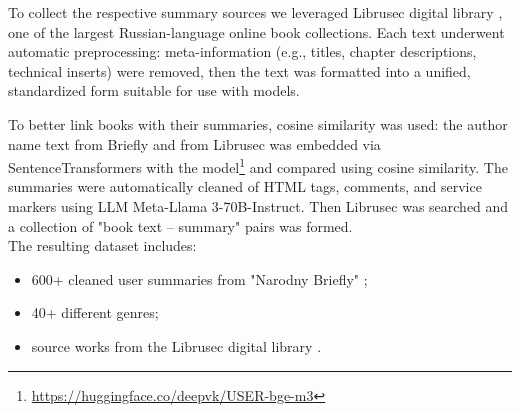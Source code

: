 \documentclass{superfri}
\begin{document}
To collect the respective summary sources we leveraged Librusec digital library \cite{librusec}, one of the largest Russian-language online book collections.
Each text underwent automatic preprocessing: meta-information (e.g., titles, chapter descriptions, technical inserts) were removed,
then the text was formatted into a unified, standardized form suitable for use with models.

To better link books with their summaries, cosine similarity was used: the author name text from Briefly \cite{Briefly} and from Librusec \cite{librusec} was embedded via SentenceTransformers
with the model\footnote{\label{encoder}\url{https://huggingface.co/deepvk/USER-bge-m3}}
and compared using cosine similarity.
The summaries were automatically cleaned of HTML tags, comments, and service markers using LLM Meta-\allowbreak Llama 3-\allowbreak 70B-\allowbreak Instruct.
Then Librusec was searched and a collection of "book text – summary" pairs was formed.
\\The resulting dataset includes:
\begin{itemize}
  \item 600+ cleaned user summaries from "Narodny Briefly" \cite{Briefly};
  \item 40+ different genres;
  \item source works from the Librusec digital library \cite{librusec}.
\end{itemize}


\end{document}
